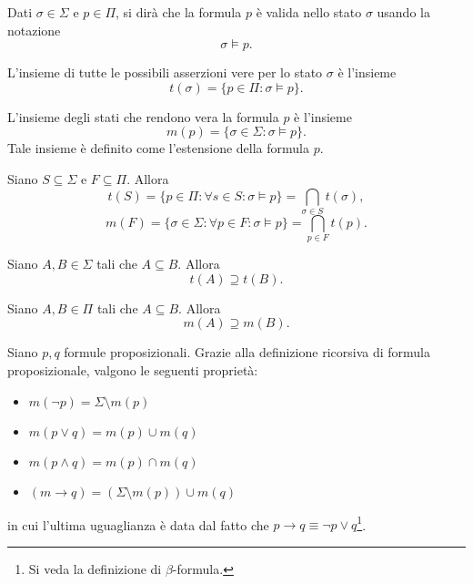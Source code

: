 {Dati $\sigma \in \Sigma$ e $ p \in \Pi$, si dir\`a che la formula $p$ \`e valida nello stato $\sigma$ usando la notazione $$\sigma \models p.$$

\begin{deff}
	L'insieme di tutte le possibili asserzioni vere per lo stato $\sigma$ \`e l'insieme $$t(\sigma)=\{p \in \Pi : \sigma \models p\}.$$
\end{deff}

\begin{deff}
	L'insieme degli stati che rendono vera la formula $p$ \`e l'insieme $$m(p)=\{\sigma \in \Sigma : \sigma \models p \}.$$
	Tale insieme \`e definito come l'estensione della formula $p$.
\end{deff}

\begin{lemma}
	Siano $S \subseteq \Sigma $ e $F \subseteq \Pi.$ Allora 
	$$t(S)=\{p \in \Pi : \forall s \in S : \sigma \models p  \} = \bigcap_{\sigma \in S}t(\sigma),$$
	$$m(F)=\{\sigma \in \Sigma : \forall p \in F : \sigma \models p  \} = \bigcap_{p \in F}t(p).$$
\end{lemma}

\begin{lemma}
	Siano $A,B \in \Sigma$ tali che $A \subseteq B$. Allora $$ t(A) \supseteq t(B).$$
\end{lemma}

\begin{lemma}
	Siano $A,B \in \Pi$ tali che $A \subseteq B$. Allora $$ m(A) \supseteq m(B).$$
\end{lemma}

\begin{lemma}
	Siano $p,q$ formule proposizionali. Grazie alla definizione ricorsiva di formula proposizionale, valgono le seguenti propriet\`a:
	\begin{itemize}
		\item $m(\neg p) = \Sigma \setminus m(p)$
		\item $m(p \lor q) = m(p) \cup m(q)$
		\item $m(p \land q) = m(p) \cap m(q)$
		\item $(m \rightarrow q) = (\Sigma \setminus m(p) )\cup m(q)$
	\end{itemize}
	in cui l'ultima uguaglianza \`e data dal fatto che $p \rightarrow q \equiv \neg p \lor q$\footnote{Si veda la definizione di $\beta$-formula.}.
\end{lemma}

}
